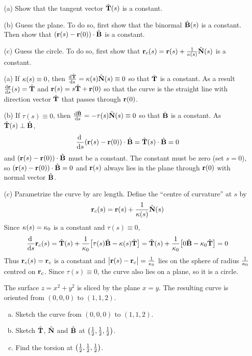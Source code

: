 \begin{hint} 
(a) Show that the tangent vector $\hat{\mathbf{T}}(s)$ is a constant.

(b) Guess the plane. To do so, first show that the binormal $\hat{\mathbf{B}}(s)$ 
    is a constant. Then show that $(\mathbf{r}(s)-\mathbf{r}(0))\cdot\hat{\mathbf{B}} $ is a constant.

(c) Guess the circle. To do so, first show that $\mathbf{r}_c(s)=\mathbf{r}(s)+\frac{1}{\kappa(s)}\hat{\mathbf{N}}(s)$ is a constant.

\end{hint}

\begin{answer} 

\end{answer}


\begin{solution}
(a) 
If $\kappa(s)\equiv 0$, then 
$\diff{\hT}{s}=\ka(s)\hN(s)\equiv 0$ so that $\hat{\mathbf{T}}$ is a constant.
As a result $\diff{\vr}{s}(s)=\hT$ and $\mathbf{r}(s) =s\hat{\mathbf{T}}+\mathbf{r}(0)$ so that
the curve is the straight line with direction vector $\hat{\mathbf{T}}$ that passes
through $\mathbf{r}(0)$.

(b) If $\tau(s)\equiv 0$, then 
$\diff{\hB}{s}=-\tau(s)\hN(s)\equiv 0$ so that $\hat{\mathbf{B}}$ is a constant.
As $\hat{\mathbf{T}}(s)\perp\hat{\mathbf{B}}$, 
\begin{equation*}
\diff{}{s} (\vr(s)-\vr(0))\cdot\hB =\hT(s)\cdot\hB=0
\end{equation*}
and $ (\mathbf{r}(s)-\mathbf{r}(0))\cdot\hat{\mathbf{B}}$ must be a constant. The constant
must be zero (set $s=0$), so $ (\mathbf{r}(s)-\mathbf{r}(0))\cdot\hat{\mathbf{B}}=0$ and $\mathbf{r}(s)$
always lies in the plane through $\mathbf{r}(0)$ with normal vector $\hat{\mathbf{B}}$.

(c) Parametrize the curve by arc length. Define the ``centre of 
curvature'' at $s$ by
\begin{equation*}
\mathbf{r}_c(s)=\mathbf{r}(s)+\frac{1}{\kappa(s)}\hat{\mathbf{N}}(s)
\end{equation*}
Since $\kappa(s)=\kappa_0$ is a constant and $\tau(s)\equiv 0$,
\begin{equation*}
\diff{}{s}\vr_c(s)
   =\hT(s)+\frac{1}{\ka_0}\big[\tau(s)\hB-\ka(s)\hT\big]
   =\hT(s)+\frac{1}{\ka_0}\big[0\hB-\ka_0\hT\big]
   =0
\end{equation*}
Thus $\mathbf{r}_c(s)=\mathbf{r}_c$ is a constant and 
$\big|\mathbf{r}(s)-\mathbf{r}_c\big|=\frac{1}{\kappa_0}$ lies on the sphere of radius
$\frac{1}{\kappa_0}$ centred on $\mathbf{r}_c$. Since $\tau(s)\equiv 0$,
the curve also lies on a plane, so it is a circle.
\end{solution}

\begin{question}[M317 2018A] %
The surface $z=x^2+y^2$ is sliced by the plane $x=y$.
The resulting curve is oriented from $(0,0,0)$ to $(1,1,2)$.
\begin{enumerate}[(a)]
\item
Sketch the curve from $(0,0,0)$ to $(1,1,2)$.
\item
Sketch $\hat{\mathbf{T}}$, $\hat{\mathbf{N}}$ and $\hat{\mathbf{B}}$ at $\big(\tfrac{1}{2},\tfrac{1}{2},\tfrac{1}{2}\big)$.
\item
Find the torsion at $\big(\tfrac{1}{2},\tfrac{1}{2},\tfrac{1}{2}\big)$.
\end{enumerate}
\end{question}

